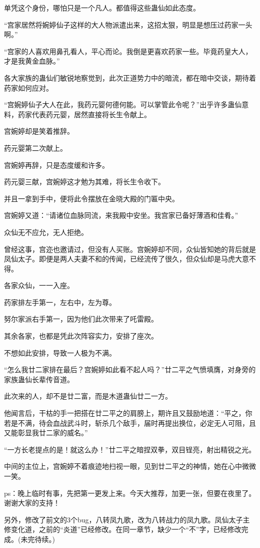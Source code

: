 \begin{this_body}
单凭这个身份，哪怕只是一个凡人。都值得这些蛊仙如此态度。

“宫家居然将婉婷仙子这样的大人物派遣出来，这招太狠，明显是想压过药家一头啊。”

“宫家的人喜欢用鼻孔看人，平心而论。我倒是更喜欢药家一些。毕竟药皇大人，才是我黄金血脉。”

各大家族的蛊仙们敏锐地察觉到，此次正道势力中的暗流，都在暗中交谈，期待着药家如何应对。

“宫婉婷仙子大人在此，我药元婴何德何能。可以掌管此令呢？”出乎许多蛊仙意料，药家代表药元婴，居然直接将长生令献上。

宫婉婷却是笑着推辞。

药元婴第二次献上。

宫婉婷再辞，只是态度缓和许多。

药元婴三献，宫婉婷这才勉为其难，将长生令收下。

并且一拿到手中，便将此令摆放在金晓大殿的门匾中央。

宫婉婷又道：“请诸位血脉同流，来我殿中安坐。我宫家已备好薄酒和佳肴。”

众仙无不应允，无人拒绝。

曾经这事，宫迩也邀请过，但没有人买账。宫婉婷却不同，众仙皆知她的背后就是凤仙太子。即便是两人夫妻不和的传闻，已经流传了很久，但众仙却是马虎大意不得。

各家众仙，一一入座。

药家排左手第一，左右中，左为尊。

努尔家派右手第一，因为他们此次带来了吒雷殿。

其余各家，也都是凭此次阵容实力，安排了座次。

不想如此安排，导致一人极为不满。

“怎么我廿二家排在最后？宫婉婷如此看不起人吗？”廿二平之气愤填膺，对身旁的家族蛊仙长辈传音道。

此次来的人，却不是廿二富，而是木道蛊仙廿二一方。

他闻言后，干枯的手一把搭在廿二平之的肩膀上，期许且又鼓励地道：“平之，你若是不满，待会血战武斗时，斩杀几个敌手，届时再提出换位，必定无人可阻，且又能彰显我廿二家的威名。”

“一方长老提点的是！就这么办！”廿二平之暗捏双拳，双目锃亮，射出精锐之光。

中间的主位上，宫婉婷不着痕迹地扫视一眼，见到廿二平之的神情，她在心中微微一笑。

ps：晚上临时有事，先把第一更发上来。今天大推荐，加更一张，但要在夜里了。谢谢大家的支持！

另外，修改了前文的3个bug，八转凤九歌，改为八转战力的凤九歌。凤仙太子主修变化道，之前的“炎道”已经修改。在同一章节，缺少一个“不”字，已经修改完成。(未完待续。)

\end{this_body}


